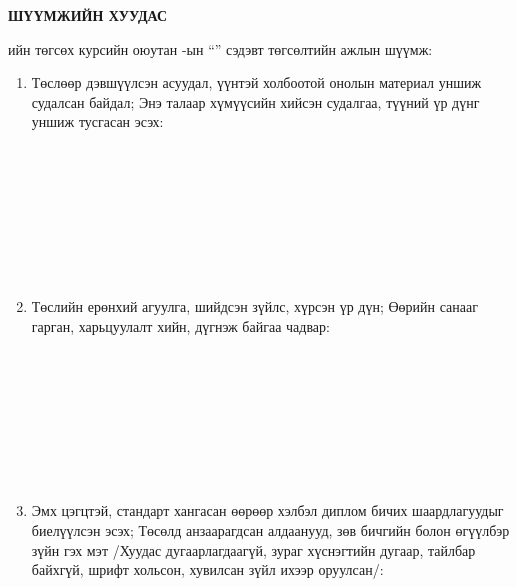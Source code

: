 \newpage

\begin{titlepage}
\begin{center}

{\scshape\Large \univname\par}
{\scshape\large \facname\par}\vspace{1cm}

\textbf{{\Large ШҮҮМЖИЙН ХУУДАС}}\\[1cm]

\end{center}

\normalsize

\deptname ийн төгсөх курсийн оюутан \shortname{}-ын ``\ttitle'' сэдэвт төгсөлтийн ажлын шүүмж:

\begin{enumerate}
\item Төслөөр дэвшүүлсэн асуудал, үүнтэй холбоотой онолын материал уншиж судалсан байдал; Энэ талаар хүмүүсийн хийсэн судалгаа, түүний үр дүнг уншиж тусгасан эсэх:
\begin{center}
\dotfill \\[0.1cm]
\dotfill \\[0.1cm]
\dotfill \\[0.1cm]
\dotfill \\[0.1cm]
\dotfill \\[0.1cm]
\dotfill \\[0.1cm]
\dotfill \\[0.4cm]
\end{center}
\item Төслийн ерөнхий агуулга, шийдсэн зүйлс, хүрсэн үр дүн; Өөрийн санааг гарган, харьцуулалт хийн, дүгнэж байгаа чадвар:
\begin{center}
\dotfill \\[0.1cm]
\dotfill \\[0.1cm]
\dotfill \\[0.1cm]
\dotfill \\[0.1cm]
\dotfill \\[0.1cm]
\dotfill \\[0.1cm]
\dotfill \\[0.4cm]
\end{center}
\item Эмх цэгцтэй, стандарт хангасан өөрөөр хэлбэл диплом бичих шаардлагуудыг биелүүлсэн эсэх; Төсөлд анзаарагдсан алдаанууд, зөв бичгийн болон өгүүлбэр зүйн гэх мэт /Хуудас дугаарлагдаагүй, зураг хүснэгтийн дугаар, тайлбар байхгүй, шрифт хольсон, хувилсан зүйл ихээр оруулсан/:

\end{enumerate}
\end{titlepage}
